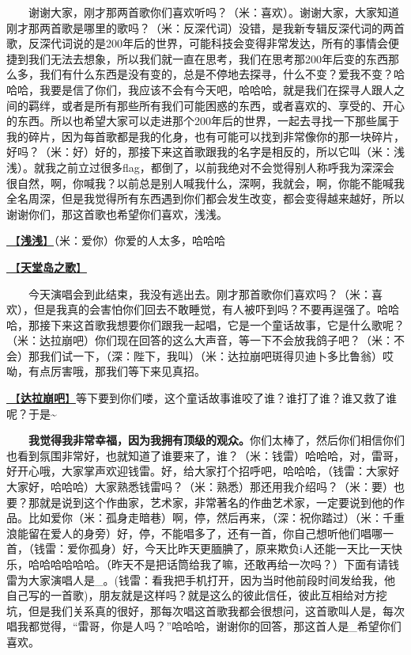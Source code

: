\documentclass[]{ctexbook}
\begin{document}
  谢谢大家，刚才那两首歌你们喜欢听吗？（米：喜欢）。谢谢大家，大家知道刚才那两首歌是哪里的歌吗？（米：反深代词）没错，是我新专辑反深代词的两首歌，反深代词说的是200年后的世界，可能科技会变得非常发达，所有的事情会便捷到我们无法去想象，所以我们就一直在思考，我们在思考那200年后变的东西那么多，我们有什么东西是没有变的，总是不停地去探寻，什么不变？爱我不变？哈哈哈，我要是信了你们，我应该不会有今天吧，哈哈哈，就是我们在探寻人跟人之间的羁绊，或者是所有那些所有我们可能困惑的东西，或者喜欢的、享受的、开心的东西。所以也希望大家可以走进那个200年后的世界，一起去寻找一下那些属于我的碎片，因为每首歌都是我的化身，也有可能可以找到非常像你的那一块碎片，好吗？（米：好）好的，那接下来这首歌跟我的名字是相反的，所以它叫（米：浅浅）。就我之前立过很多flag，都倒了，以前我绝对不会觉得别人称呼我为深深会很自然，啊，你喊我？以前总是别人喊我什么，深啊，我就会，啊，你能不能喊我全名周深，但是我觉得所有东西遇到你们都会发生改变，都会变得越来越好，所以谢谢你们，那这首歌也希望你们喜欢，浅浅。

\hyperref[qianqian]{🎵【\textbf{浅浅}】}（米：爱你）你爱的人太多，哈哈哈

\hyperref[haven-song]{🎵【\textbf{天堂岛之歌}】}

  今天演唱会到此结束，我没有逃出去。刚才那首歌你们喜欢吗？（米：喜欢），但是我真的会害怕你们回去不敢睡觉，有人被吓到吗？不要再逞强了。哈哈哈，那接下来这首歌我想要你们跟我一起唱，它是一个童话故事，它是什么歌呢？（米：达拉崩吧）你们现在回答的这么大声音，等一下不会放我鸽子吧？（米：不会）那我们试一下，（深：陛下，我叫）（米：达拉崩吧斑得贝迪卜多比鲁翁）哎呦，有点厉害哦，那我们等下来见真招。

\hyperref[dalabengba]{🎵【\textbf{达拉崩吧}】}等下要到你们喽，这个童话故事谁咬了谁？谁打了谁？谁又救了谁呢？于是\textasciitilde{}

  \textbf{我觉得我非常幸福，因为我拥有顶级的观众。}你们太棒了，然后你们相信你们也看到氛围非常好，也就知道了谁要来了，谁？（米：钱雷）哈哈哈，对，雷哥，好开心哦，大家掌声欢迎钱雷。好，给大家打个招呼吧，哈哈哈，（钱雷：大家好大家好，哈哈哈）大家熟悉钱雷吗？（米：熟悉）那还用我介绍吗？（米：要）也要？那就是说到这个作曲家，艺术家，非常著名的作曲艺术家，一定要说到他的作品。比如爱你（米：孤身走暗巷）啊，停，然后再来，（深：祝你踏过）（米：千重浪能留在爱人的身旁）好，停，不能唱多了，还有一首，你自己想听他们唱哪一首，（钱雷：爱你孤身）好，今天比昨天更腼腆了，原来欺负i人还能一天比一天快乐，哈哈哈哈哈哈。（昨天不是把话筒给我了嘛，还敢再给一次吗？）下面有请钱雷为大家演唱人是\_。(钱雷：看我把手机打开，因为当时他前段时间发给我，他自己写的一首歌)，朋友就是这样吗？就是这么的彼此信任，彼此互相给对方挖坑，但是我们关系真的很好，那每次唱这首歌我都会很想问，这首歌叫人是，每次唱我都觉得，``雷哥，你是人吗？''哈哈哈，谢谢你的回答，那这首人是\_希望你们喜欢。
\end{document}
